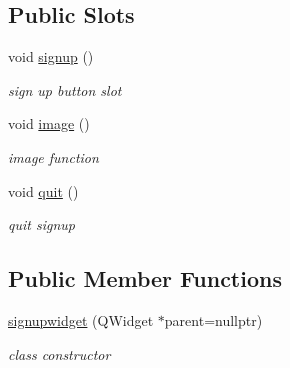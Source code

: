 \subsection*{Public Slots}
\begin{DoxyCompactItemize}
\item 
void \hyperlink{classsignupwidget_af3e836d1d5c48db21b8ae0bcaf1e8216}{signup} ()
\begin{DoxyCompactList}\small\item\em sign up button slot \end{DoxyCompactList}\item 
void \hyperlink{classsignupwidget_a70de3f9e8d27a1704a3678d3148f6e46}{image} ()
\begin{DoxyCompactList}\small\item\em image function \end{DoxyCompactList}\item 
void \hyperlink{classsignupwidget_a61682f0dccbdcaa63a4b07434dc52e62}{quit} ()
\begin{DoxyCompactList}\small\item\em quit signup \end{DoxyCompactList}\end{DoxyCompactItemize}
\subsection*{Public Member Functions}
\begin{DoxyCompactItemize}
\item 
\hyperlink{classsignupwidget_a1feed302f7dfc610bba7f28efb1ae554}{signupwidget} (Q\+Widget $\ast$parent=nullptr)
\begin{DoxyCompactList}\small\item\em class constructor \end{DoxyCompactList}\end{DoxyCompactItemize}
